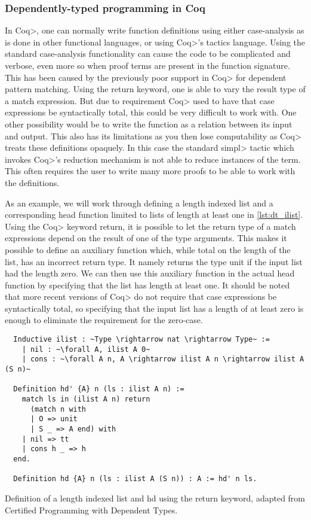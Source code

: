\subsubsection{Dependently-typed programming in Coq}
In \<Coq>, one can normally write function definitions using either case-analysis as is done in other functional languages, or using \<Coq>'s tactics language.
Using the standard case-analysis functionality can cause the code to be complicated and verbose, even more so when proof terms are present in the function signature.
This has been caused by the previously poor support in \<Coq> for dependent pattern matching.
Using the return keyword, one is able to vary the result type of a match expression. But due to requirement \<Coq> used to have that case expressions be syntactically total, this could be very difficult to work with.
One other possibility would be to write the function as a relation between its input and output.
This also has its limitations as you then lose computability as \<Coq> treats these definitions opaquely. In this case the standard \<simpl> tactic which invokes \<Coq>'s reduction mechanism is not able to reduce instances of the term.
This often requires the user to write many more proofs to be able to work with the definitions.

As an example, we will work through defining a length indexed list and a corresponding head function limited to lists of length at least one in \cref{lst:dt_ilist}.
Using the \<Coq> keyword return, it is possible to let the return type of a match expressions depend on the result of one of the type arguments.
This makes it possible to define an auxiliary function which, while total on the length of the list, has an incorrect return type. It namely returns the type unit if the input list had the length zero.
We can then use this auxiliary function in the actual head function by specifying that the list has length at least one.
It should be noted that more recent versions of \<Coq> do not require that case expressions be syntactically total, so specifying that the input list has a length of at least zero is enough to eliminate the requirement for the zero-case.

\begin{listing}
  \begin{verbatim}
  Inductive ilist : ~Type \rightarrow nat \rightarrow Type~ :=
    | nil : ~\forall A, ilist A 0~
    | cons : ~\forall A n, A \rightarrow ilist A n \rightarrow ilist A (S n)~

  Definition hd' {A} n (ls : ilist A n) :=
    match ls in (ilist A n) return
      (match n with
      | O => unit
      | S _ => A end) with
    | nil => tt
    | cons h _ => h
  end.

  Definition hd {A} n (ls : ilist A (S n)) : A := hd' n ls.
  \end{verbatim}
  \caption{Definition of a length indexed list and hd using the return keyword, adapted from Certified Programming with Dependent Types\cite{ChlipalaCPDT}.}
  \label{lst:dt_ilist}
\end{listing}

